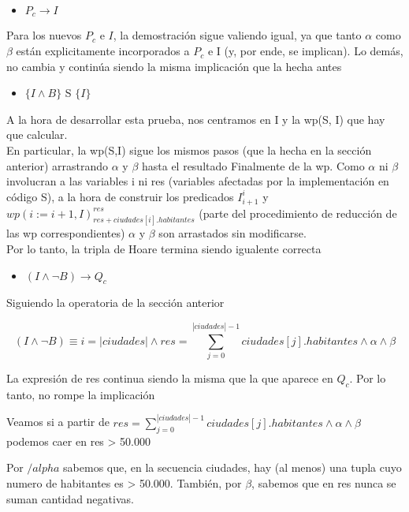 \documentclass[10pt,a4paper]{article}
\begin{document}
\begin {enumerate}
    \begin{itemize}
        \item $P_{c} \to I$
    \end{itemize}

    Para los nuevos $P_{c}$ e $I$, la demostración sigue valiendo igual, ya que tanto $\alpha$ como $\beta$ están explicitamente incorporados a 
    $P_{c}$ e I (y, por ende, se implican). Lo demás, no cambia y continúa siendo la misma implicación que la hecha antes

    \begin{itemize}
        \item $\{ I \land B \}$ S $ \{ I\}$
    \end{itemize}

    A la hora de desarrollar esta prueba, nos centramos en I y la wp(S, I) que hay que calcular. \\
    En particular, la wp(S,I) sigue los mismos pasos (que la hecha en la sección anterior) arrastrando $\alpha $ y $\beta$ hasta el resultado Finalmente
    de la wp. Como $\alpha $ ni $\beta$ involucran a las variables i ni res (variables afectadas por la implementación en código S), a la
    hora de construir los predicados $I_{i + 1}^{i}$ y $wp(i := i + 1, I)_{res + ciudades[i].habitantes}^{res}$ (parte del procedimiento de 
    reducción de las wp correspondientes) $\alpha $ y $\beta$ son arrastados sin modificarse. \\

    Por lo tanto, la tripla de Hoare termina siendo igualente correcta

    \begin{itemize}
        \item $(I \land \neg B) \to Q_{c}$
    \end{itemize}

    Siguiendo la operatoria de la sección anterior

    $$ (I \land \neg B) \equiv i = |ciudades| \land res = \sum\limits^{|ciudades|- 1}_{j = 0}{ciudades[j].habitantes} \land \alpha \land \beta $$

    La expresión de res continua siendo la misma que la que aparece en $Q_{c}$. Por lo tanto, no rompe la implicación

    Veamos si a partir de $res = \sum\limits^{|ciudades|- 1}_{j = 0}{ciudades[j].habitantes} \land \alpha \land \beta$ podemos caer en res > 50.000

    Por $/alpha$ sabemos que, en la secuencia ciudades, hay (al menos) una tupla cuyo numero de habitantes es > 50.000. También, por $\beta$, sabemos
    que en res nunca se suman cantidad negativas.


\end{enumerate}
\end{document}
